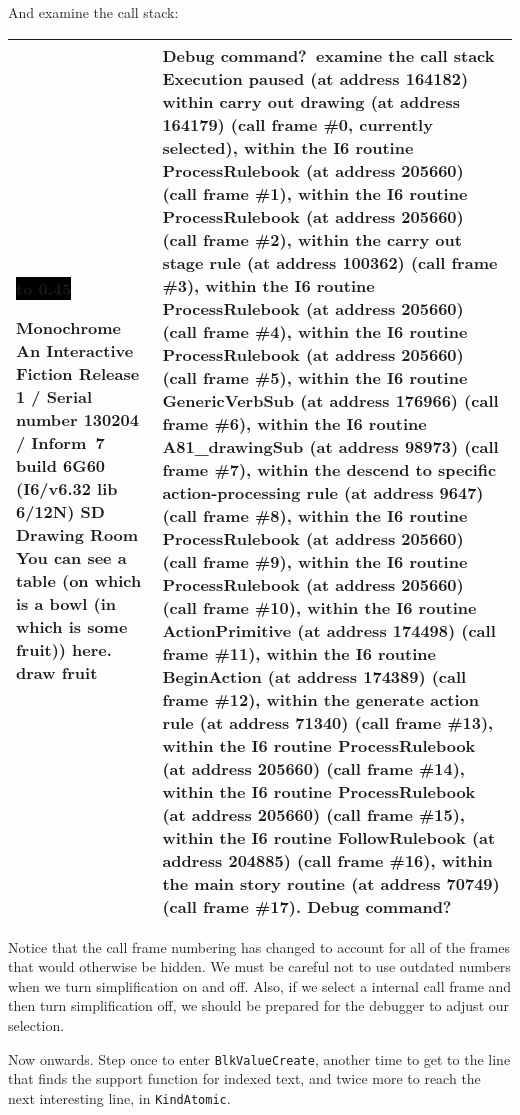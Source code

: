 \documentclass{book}
\newcommand{\n}{\hspace*{\fill}\newline}
\newcommand{\terp}[2]{\begin{center}\begin{tabular}{p{0.45\textwidth}|p{0.45\textwidth}}\midrule #1&#2\\\midrule\end{tabular}\end{center}}
\newcommand{\glkheading}[1]{\textbf{#1}}
\newcommand{\glkinput}[1]{\textbf{#1}}
\newcommand{\glkstatusline}[2]{\centerline{\colorbox{black}{\hbox to 0.45\textwidth{\textcolor{white}{#1\hfil #2}}}}}
\newcommand{\storyprompt}{\raisebox{1.5pt}{\(>\)}}
\newcommand{\cursor}{\raisebox{-1.5pt}{\RectangleThin}}
\begin{document}
And examine the call stack:

\terp{\glkstatusline{Drawing Room}{0/1}\n
  \glkheading{Monochrome}\n
  An Interactive Fiction\n
  Release 1 / Serial number 130204 / Inform~7 build 6G60 (I6/v6.32 lib 6/12N) SD\n
  \n
  \glkheading{Drawing Room}\n
  You can see a table (on which is a bowl (in which is some fruit)) here.\n
  \n
  \storyprompt\glkinput{draw fruit}}{%
  Debug command?\ \glkinput{examine the call stack}\n
  \n
  Execution paused (at address 164182)\n
  within carry out drawing (at address 164179) (call frame \#0, currently selected),\n
  within the I6 routine ProcessRulebook (at address 205660) (call frame \#1),\n
  within the I6 routine ProcessRulebook (at address 205660) (call frame \#2),\n
  within the carry out stage rule (at address 100362) (call frame \#3),\n
  within the I6 routine ProcessRulebook (at address 205660) (call frame \#4),\n
  within the I6 routine ProcessRulebook (at address 205660) (call frame \#5),\n
  within the I6 routine GenericVerbSub (at address 176966) (call frame \#6),\n
  within the I6 routine A81\_drawingSub (at address 98973) (call frame \#7),\n
  within the descend to specific action-processing rule (at address 9647) (call frame \#8),\n
  within the I6 routine ProcessRulebook (at address 205660) (call frame \#9),\n
  within the I6 routine ProcessRulebook (at address 205660) (call frame \#10),\n
  within the I6 routine ActionPrimitive (at address 174498) (call frame \#11),\n
  within the I6 routine BeginAction (at address 174389) (call frame \#12),\n
  within the generate action rule (at address 71340) (call frame \#13),\n
  within the I6 routine ProcessRulebook (at address 205660) (call frame \#14),\n
  within the I6 routine ProcessRulebook (at address 205660) (call frame \#15),\n
  within the I6 routine FollowRulebook (at address 204885) (call frame \#16),\n
  within the main story routine (at address 70749) (call frame \#17).\n
  \n
  Debug command?\ \cursor}

Notice that the call frame numbering has changed to account for all of the
frames that would otherwise be hidden.  We must be careful not to use outdated
numbers when we turn simplification on and off.  Also, if we select a internal
call frame and then turn simplification off, we should be prepared for the
debugger to adjust our selection.

Now onwards.  Step once to enter \lstinline{BlkValueCreate}, another time to get
to the line that finds the support function for indexed text, and twice more to
reach the next interesting line, in \lstinline{KindAtomic}.
\end{document}
